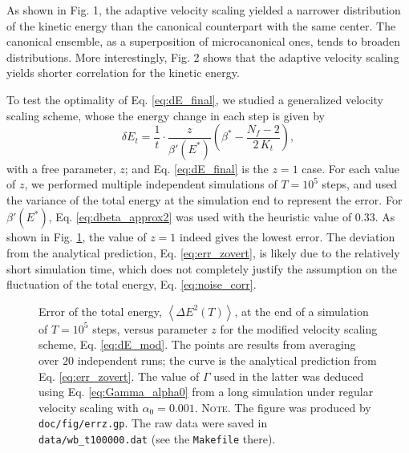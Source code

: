 \documentclass[reprint]{revtex4-1}
\newcommand{\note}[1]{{\color{DarkGreen}\footnotesize \textsc{Note.} #1}}
\begin{document}
As shown in Fig. 1,
the adaptive velocity scaling yielded a narrower distribution
of the kinetic energy than the canonical counterpart
with the same center.
%
The canonical ensemble, as a superposition
of microcanonical ones,
tends to broaden distributions.
%
More interestingly,
Fig. 2 shows that the adaptive velocity scaling
yields shorter correlation for the kinetic energy.

To test the optimality of Eq. \eqref{eq:dE_final},
we studied a generalized velocity scaling scheme,
whose the energy change in each step is given by
\begin{equation}
  \delta E_t
  =
  \frac{ 1 } { t } \cdot
  \frac{ z } { \beta'(E^*) }
  \left(
   \beta^* -
   \frac{ N_f - 2 }
   { 2 \, K_t }
  \right)
  ,
  \label{eq:dE_mod}
\end{equation}
%
with a free parameter, $z$;
and Eq. \eqref{eq:dE_final} is the $z = 1$ case.
%
For each value of $z$,
we performed multiple independent simulations of $T = 10^5$ steps,
and used the variance of the total energy at the simulation end
to represent the error.
%
For $\beta'(E^*)$,
Eq. \eqref{eq:dbeta_approx2} was used with the heuristic value of $0.33$.
%
As shown in Fig. \ref{fig:errz},
the value of $z = 1$
indeed gives the lowest error.
%
The deviation from the analytical prediction,
Eq. \eqref{eq:err_zovert},
is likely due to the relatively short simulation time,
which does not completely justify the assumption
on the fluctuation of the total energy, Eq. \eqref{eq:noise_corr}.

\begin{figure}[h]
\begin{center}
  \caption{
    \label{fig:errz}
    Error of the total energy,
    $\left\langle \Delta E^2(T) \right\rangle$,
    at the end of a simulation of $T = 10^5$ steps,
    versus parameter $z$
    for the modified velocity scaling scheme,
    Eq. \eqref{eq:dE_mod}.
    The points are results from averaging over $20$ independent runs;
    the curve is the analytical prediction from
    Eq. \eqref{eq:err_zovert}.
    The value of $\Gamma$ used in the latter was deduced
    using Eq. \eqref{eq:Gamma_alpha0} from
    a long simulation under regular velocity scaling
    with $\alpha_0 = 0.001$.
    \note{The figure was produced by \texttt{doc/fig/errz.gp}.
      The raw data were saved in \texttt{data/wb\_t100000.dat}
      (see the \texttt{Makefile} there).
    }%
  }
\end{center}
\end{figure}
\end{document}
